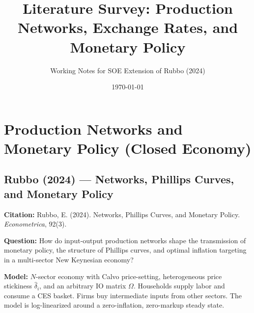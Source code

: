 \documentclass[12pt]{article}
\title{Literature Survey: Production Networks, Exchange Rates, and Monetary Policy}
\author{Working Notes for SOE Extension of Rubbo (2024)}
\date{\today}
\begin{document}
\maketitle
\tableofcontents
\newpage

\section{Production Networks and Monetary Policy (Closed Economy)}

\subsection{Rubbo (2024) --- Networks, Phillips Curves, and Monetary Policy}

\textbf{Citation:} Rubbo, E. (2024). Networks, Phillips Curves, and Monetary Policy. \textit{Econometrica}, 92(3).

\textbf{Question:} How do input-output production networks shape the transmission of monetary policy, the structure of Phillips curves, and optimal inflation targeting in a multi-sector New Keynesian economy?

\textbf{Model:} $N$-sector economy with Calvo price-setting, heterogeneous price stickiness $\hat{\delta}_i$, and an arbitrary IO matrix $\Omega$. Households supply labor and consume a CES basket. Firms buy intermediate inputs from other sectors. The model is log-linearized around a zero-inflation, zero-markup steady state.
\end{document}

